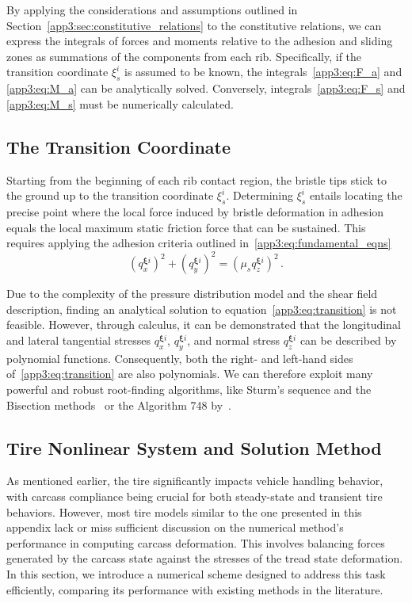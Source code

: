 By applying the considerations and assumptions outlined in Section~\ref{app3:sec:constitutive_relations} to the constitutive relations, we can express the integrals of forces and moments relative to the adhesion and sliding zones as summations of the components from each rib. Specifically, if the transition coordinate $\xi_s^i$ is assumed to be known, the integrals~\eqref{app3:eq:F_a} and \eqref{app3:eq:M_a} can be analytically solved. Conversely, integrals~\eqref{app3:eq:F_s} and \eqref{app3:eq:M_s} must be numerically calculated.

\subsection{The Transition Coordinate}

Starting from the beginning of each rib contact region, the bristle tips stick to the ground up to the transition coordinate $\xi_s^i$. Determining $\xi_s^i$ entails locating the precise point where the local force induced by bristle deformation in adhesion equals the local maximum static friction force that can be sustained. This requires applying the adhesion criteria outlined in~\eqref{app3:eq:fundamental_eqns}
%
\begin{equation}
  \left(q_{x}^{\bm{\xi}i}\right)^{2} + \left(q_{y}^{\bm{\xi}i}\right)^{2} = \left(\mu_s q_{z}^{\bm{\xi}i}\right)^{2} \, \text{.}
  \label{app3:eq:transition}
\end{equation}

Due to the complexity of the pressure distribution model and the shear field description, finding an analytical solution to equation~\eqref{app3:eq:transition} is not feasible. However, through calculus, it can be demonstrated that the longitudinal and lateral tangential stresses $q_{x}^{\bm{\xi}i}$, $q_{y}^{\bm{\xi}i}$, and normal stress $q_{z}^{\bm{\xi}i}$ can be described by polynomial functions. Consequently, both the right- and left-hand sides of~\eqref{app3:eq:transition} are also polynomials. We can therefore exploit many powerful and robust root-finding algorithms, like Sturm's sequence and the Bisection methods~\cite{bulirsch2002introduction} or the Algorithm 748 by~\citet{alefeld1995algorithm}.

\subsection{Tire Nonlinear System and Solution Method}

As mentioned earlier, the tire significantly impacts vehicle handling behavior, with carcass compliance being crucial for both steady-state and transient tire behaviors. However, most tire models similar to the one presented in this appendix lack or miss sufficient discussion on the numerical method's performance in computing carcass deformation. This involves balancing forces generated by the carcass state against the stresses of the tread state deformation. In this section, we introduce a numerical scheme designed to address this task efficiently, comparing its performance with existing methods in the literature.

